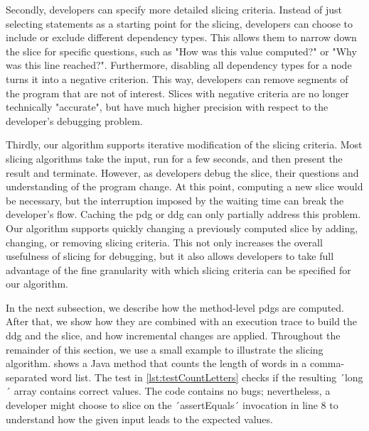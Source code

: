 Secondly, developers can specify more detailed slicing criteria.
Instead of just selecting statements as a starting point for the slicing, developers can choose to include or exclude different dependency types.
This allows them to narrow down the slice for specific questions, such as "How was this value computed?" or "Why was this line reached?".
Furthermore, disabling all dependency types for a node turns it into a negative criterion.
This way, developers can remove segments of the program that are not of interest.
Slices with negative criteria are no longer technically "accurate", but have much higher precision with respect to the developer's debugging problem.

Thirdly, our algorithm supports iterative modification of the slicing criteria.
Most slicing algorithms take the input, run for a few seconds, and then present the result and terminate.
However, as developers debug the slice, their questions and understanding of the program change.
At this point, computing a new slice would be necessary, but the interruption imposed by the waiting time can break the developer's flow.
Caching the \ac{pdg} or \ac{ddg} can only partially address this problem.
Our algorithm supports quickly changing a previously computed slice by adding, changing, or removing slicing criteria.
This not only increases the overall usefulness of slicing for debugging, but it also allows developers to take full advantage of the fine granularity with which slicing criteria can be specified for our algorithm.

%

In the next subsection, we describe how the method-level \acp{pdg} are computed.
After that, we show how they are combined with an execution trace to build the \ac{ddg} and the slice, and how incremental changes are applied.
Throughout the remainder of this section, we use a small example to illustrate the slicing algorithm.
 shows a Java method that counts the length of words in a comma-separated word list.
The test in \cref{lst:testCountLetters} checks if the resulting ´long´ array contains correct values.
The code contains no bugs; nevertheless, a developer might choose to slice on the ´assertEquals´ invocation in line 8 to understand how the given input leads to the expected values.

